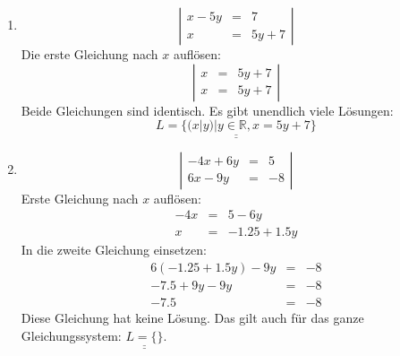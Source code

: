 \documentclass[%
11pt,%
twoside,%
titlepage,%
german,%
]{scrartcl}
\newcommand{\result}[1]{\underline{\underline{#1}}}
\begin{document}
\begin{enumerate}
\begin{enumerate}
  \item 
    \begin{displaymath}
      \left| 
        \begin{array}{rcl}
         x-5y & = & 7 \\
         x & = & 5y+7
        \end{array} \right|
    \end{displaymath}
    Die erste Gleichung nach $x$ aufl\"osen:
    \begin{displaymath}
      \left| 
        \begin{array}{rcl}
         x & = & 5y+7 \\
         x & = & 5y+7
        \end{array} \right|
    \end{displaymath}
    Beide Gleichungen sind identisch. Es gibt unendlich viele L\"osungen:
    \begin{displaymath}
      \result{L = \{(x|y)|y\in\mathbb{R}, x=5y+7\}}
    \end{displaymath}

  \item 
    \begin{displaymath}
      \left| 
        \begin{array}{rcl}
          -4x+6y & = & 5 \\
          6x-9y & = & -8
        \end{array} \right|
    \end{displaymath}
Erste Gleichung nach $x$ aufl\"osen:
\begin{eqnarray*}
-4x & = & 5-6y \\
x & = & -1.25+1.5y
\end{eqnarray*}
In die zweite Gleichung einsetzen:
\begin{eqnarray*}
6(-1.25+1.5y)-9y & = & -8 \\
-7.5+9y-9y & = & -8 \\
-7.5 & = & -8
\end{eqnarray*}
Diese Gleichung hat keine L\"osung. Das gilt auch f\"ur das ganze Gleichungssystem: $\result{L=\{\}}$.


\end{enumerate}
\end{enumerate}
\end{document}
